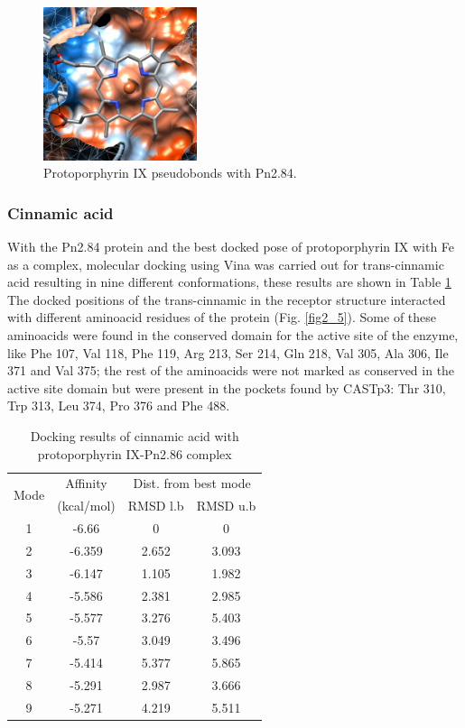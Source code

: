 \documentclass[12pt]{article}
\begin{document}
	\FloatBarrier
	
	\FloatBarrier
	\begin{figure}[H]
		\centering
		\includegraphics[width=0.4\textwidth]{../2/Dock/chimera.png}
		\caption{Protoporphyrin IX pseudobonds with Pn2.84.}
		\label{fig2_4}
	\end{figure}
	\FloatBarrier
	
	
	\subsubsection{Cinnamic acid}
	
	With the Pn2.84 protein and the best docked pose of protoporphyrin IX with Fe as a complex, molecular docking using Vina was carried out for trans-cinnamic acid resulting in nine different conformations, these results are shown in Table \ref{table2_2} The docked positions of the trans-cinnamic in the receptor structure interacted with different aminoacid residues of the protein (Fig. \ref{fig2_5}). Some of these aminoacids were found in the conserved domain for the active site of the enzyme, like Phe 107, Val 118, Phe 119, Arg 213, Ser 214, Gln 218, Val 305, Ala 306, Ile 371 and Val 375; the rest of the aminoacids were not marked as conserved in the active site domain but were present in the pockets found by CASTp3: Thr 310, Trp 313, Leu 374, Pro 376 and Phe 488.
	
	\begin{table}[h]
		\centering
		\caption{Docking results of cinnamic acid with protoporphyrin IX-Pn2.86 complex}
		\label{table2_2}
		\begin{tabular}{cccc}
			\toprule
			\multirow{2}{*}{Mode} & Affinity & \multicolumn{2}{c}{Dist. from best mode}\\
			&  (kcal/mol) & RMSD l.b & RMSD u.b\\
			\midrule
			1 &  -6.66   &       0   &         0\\
			2 & -6.359   &   2.652   &     3.093\\
			3 & -6.147   &   1.105   &     1.982\\
			4 & -5.586   &   2.381   &     2.985\\
			5 & -5.577   &   3.276   &     5.403\\
			6 &  -5.57   &   3.049   &     3.496\\
			7 & -5.414   &   5.377   &     5.865\\
			8 & -5.291   &   2.987   &     3.666\\
			9 & -5.271   &   4.219   &     5.511\\
			\bottomrule
			
		\end{tabular}
	\end{table}
\end{document}
